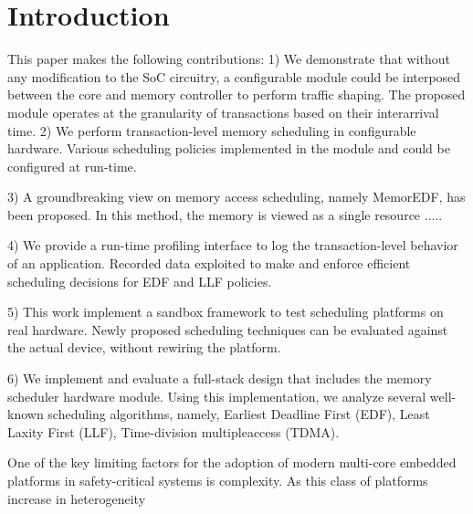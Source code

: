 \section{Introduction}


This paper makes the following contributions:
1) We demonstrate that without any modification to the SoC circuitry, a configurable module could be interposed between the core and memory controller to perform traffic shaping. The proposed module operates at the granularity of transactions based on their interarrival time.
2) We perform transaction-level memory scheduling in configurable hardware. Various scheduling policies implemented in the module and could be configured at run-time.

3) A groundbreaking view on memory access scheduling, namely MemorEDF, has been proposed. In this method, the memory is viewed as a single resource .....

4) We provide a run-time profiling interface to log the transaction-level behavior of an application. Recorded data exploited to make and enforce efficient scheduling decisions for EDF and LLF policies.

5) This work implement a sandbox framework to test scheduling platforms on real hardware. Newly proposed scheduling techniques can be evaluated against the actual device, without rewiring the platform.

6) We implement and evaluate a full-stack design that includes the memory scheduler hardware module. Using this implementation, we analyze several well-known scheduling algorithms, namely, Earliest Deadline First (EDF), Least Laxity First (LLF), Time-division multipleaccess (TDMA).



One of the key limiting factors for the adoption of modern multi-core
embedded platforms in safety-critical systems is complexity. As this
class of platforms increase in heterogeneity
